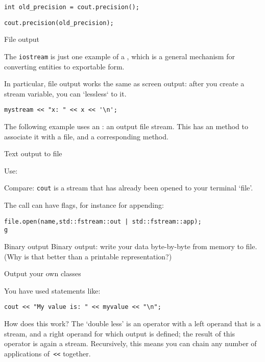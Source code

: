 \begin{verbatim}
int old_precision = cout.precision();
\end{verbatim}

\begin{verbatim}
cout.precision(old_precision);
\end{verbatim}

 {File output}

The \lstinline{iostream} is just one example of a ,
which is a general mechanism for converting entities to exportable form.

In particular, file output works the same as screen output:
after you create a stream variable, you can `lessless` to it.
\begin{lstlisting}
mystream << "x: " << x << '\n';
\end{lstlisting}

The following example uses an :
an output file stream.
This has an  method
to associate it with a file, and a corresponding  method.

\begin{block}{Text output to file}
  \label{sl:io-file}

  Use:
  \def\snippetcodefraction{.5}
  \def\snippetanswfraction{.5}

  Compare: \lstinline{cout} is a stream that has already been opened
  to your terminal `file'.
\end{block}

The  call can have flags, for instance for appending:
\begin{lstlisting}
file.open(name,std::fstream::out | std::fstream::app);
g\end{lstlisting}

\begin{block}{Binary output}
  \label{sl:io-bin}
  Binary output: write your data byte-by-byte from memory to file.\\
  (Why is that better than a printable representation?)
  
\end{block}

 {Output your own classes}
\label{sec:lessless}

You have used statements like:
\begin{verbatim}
cout << "My value is: " << myvalue << "\n";
\end{verbatim}
How does this work? The `double less' is an operator with a left
operand that is a stream, and a right operand for which output is
defined; the result of this operator is again a stream. Recursively,
this means you can chain any number of applications of~\verb+<<+
together.


